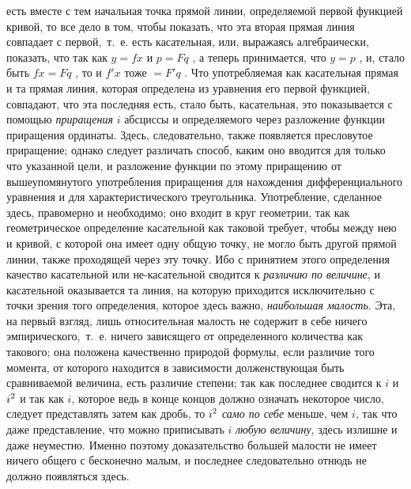 есть вместе с тем начальная точка прямой линии, определяемой первой
функцией кривой, то все дело в том, чтобы показать, что эта вторая прямая
линия совпадает с первой,~т.~е. есть касательная, или, выражаясь
алгебраически, показать, что так как $y=\mathit{fx}$  и  $p=\mathit{Fq}$ ,
а теперь принимается, что  $y=p$ , и, стало быть  $\mathit{fx}=\mathit{Fq}$
, то и  $f'x$  тоже  $=F'q$ . Что употребляемая как касательная прямая и та
прямая линия, которая определена из уравнения его первой функцией,
совпадают, что эта последняя есть, стало быть, касательная, это
показывается с помощью {\em приращения}
$i$ абсциссы и определяемого через разложение
функции приращения ординаты. Здесь, следовательно, также появляется
пресловутое приращение; однако следует различать способ, каким оно вводится
для только что указанной цели, и разложение функции по этому приращению от
вышеупомянутого употребления приращения для нахождения дифференциального
уравнения и для характеристического треугольника. Употребление, сделанное
здесь, правомерно и необходимо; оно входит в круг геометрии, так как
геометрическое определение касательной как таковой требует, чтобы между нею
и кривой, с которой она имеет одну общую точку, не могло быть другой прямой
линии, также проходящей через эту точку. Ибо с принятием этого определения
качество касательной или не-касательной сводится к
{\em различию по величине}, и касательной оказывается
та линия, на которую приходится исключительно с точки зрения того
определения, которое здесь важно, {\em наибольшая
малость}. Эта, на первый взгляд, лишь относительная малость не содержит в
себе ничего эмпирического,~т.~е. ничего зависящего от определенного
количества как такового; она положена качественно природой формулы, если
различие того момента, от которого находится в зависимости долженствующая
быть сравниваемой величина, есть различие степени; так как последнее
сводится к $i$ и
$i\textsuperscript{2}$ и так как
$i$, которое ведь в конце концов должно означать
некоторое число, следует представлять затем как дробь, то
$i\textsuperscript{2}$
{\em само по себе} меньше, чем
$i$, так что даже представление, что можно
приписывать $i$ {\em любую
величину}, здесь излишне и даже неуместно. Именно поэтому доказательство
большей малости не имеет ничего общего с бесконечно малым, и последнее
следовательно отнюдь не должно появляться здесь.


